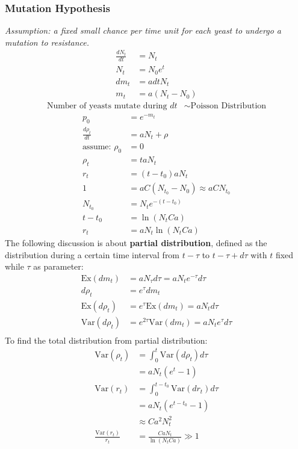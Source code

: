\documentclass[UTF-8]{article}
\begin{document}
\subsubsection{Mutation Hypothesis}
\textit{Assumption: a fixed small chance per time unit for each yeast to undergo a mutation to resistance.}
\begin{align}
    \frac{dN_t}{dt}&=N_t\\
    N_t &=N_0e^t\\
    dm_t &=a dt N_t\\
    m_t &=a(N_t-N_0)
\end{align}
\begin{align}
    \text{Number of yeasts mutate during }dt&\sim\text{Poisson Distribution}
\end{align}
\begin{align}
    p_0&=e^{-m_t}\\
    \frac{d \rho _t}{dt}&=aN_t+\rho\\
    \text{assume: }\rho_0&=0\\
    \rho_t&=taN_t\\
    r_t&=(t-t_0)aN_t\\
    1&=aC(N_{t_0}-N_0)\approx aCN_{t_0}\\
    N_{t_0}&=N_te^{-(t-t_0)}\\
    t-t_0&=\ln(N_tCa)\\
    r_t&=aN_t\ln(N_tCa)
\end{align}
The following discussion is about \textbf{partial distribution}, defined as the distribution during a certain time interval from $t-\tau$ to $t-\tau+d\tau$ with $t$ fixed while $\tau$ as parameter:
\begin{align}
    \text{Ex}(dm_t)&=aN_{\tau}d\tau =aN_te^{-\tau}d \tau\\
    d\rho_t&=e^{\tau}dm_t\\
    \text{Ex}(d\rho_t)&=e^{\tau}\text{Ex}(dm_t)=aN_td\tau\\
    \text{Var}(d{\rho_t})&=e^{2\tau}\text{Var}(dm_t)=aN_te^{\tau}d\tau\\
\end{align}
To find the total distribution from partial distribution:
\begin{align}
    \text{Var}({\rho_t})&=\int_{0}^{t}\text{Var}({d\rho_t})d\tau\\
    &=aN_t(e^t-1)\\
    \text{Var}({r_t})&=\int_{0}^{t-t_0}\text{Var}({dr_t})d\tau\\
    &=aN_t(e^{t-t_0}-1)\\
    &\approx Ca^2N_t^2\\
    \frac{\text{Var}(r_t)}{r_t}&=\frac{CaN_t}{\ln(N_tCa)}\gg 1
\end{align}
\end{document}
